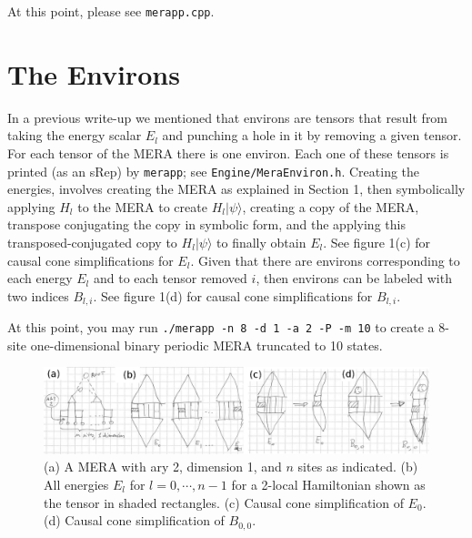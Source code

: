 \documentclass{article}
\newcommand{\code}[1]{\texttt{#1}}
\begin{document}
At this point, please see \code{merapp.cpp}.

\section{The Environs}
In a previous write-up we mentioned that environs are tensors that result from taking the energy scalar $E_l$ and punching a hole
in it by removing a given tensor. For each tensor of the MERA there is one environ.
Each one of these tensors is printed (as an sRep) by \code{merapp}; see \code{Engine/MeraEnviron.h}.
Creating the energies, involves creating the MERA as explained in Section 1, then symbolically applying $H_l$ to the MERA
to create $H_l|\psi\rangle$, creating
a copy of the MERA, transpose conjugating the copy in symbolic form, and the applying this transposed-conjugated copy to
 $H_l|\psi\rangle$ to finally obtain $E_l$. See figure 1(c) for causal cone simplifications for $E_l$.
Given that there are environs corresponding to each energy $E_l$ and to each tensor removed $i$, then environs can be
labeled with two indices $B_{l, i}$. See figure 1(d) for causal cone simplifications for $B_{l, i}$.

At this point, you may run \code{./merapp -n 8 -d 1 -a 2 -P -m 10}
to create a 8-site one-dimensional binary periodic MERA truncated to 10 states.
\begin{figure}
	\includegraphics[clip,width=\textwidth]{figure1.png}%
\caption{(a) A MERA with ary 2, dimension 1, and $n$ sites as indicated.
	(b) All energies $E_l$ for $l=0,\cdots,n-1$ for a 2-local Hamiltonian shown as the tensor in shaded rectangles.
	(c) Causal cone simplification of $E_0$. (d) Causal cone simplification of $B_{0,0}$.}
\end{figure}
\end{document}

